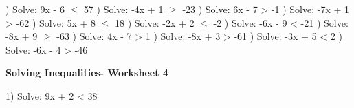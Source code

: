 \documentclass{article}%
\begin{document}
\newline%
) Solve: 9x - 6 $\leq$ 57%
\newline%
\newline%
) Solve: -4x + 1 $\geq$ -23%
\newline%
\newline%
) Solve: 6x - 7 > -1%
\newline%
\newline%
) Solve: -7x + 1 > -62%
\newline%
\newline%
) Solve: 5x + 8 $\leq$ 18%
\newline%
\newline%
) Solve: -2x + 2 $\leq$ -2%
\newline%
\newline%
) Solve: -6x - 9 < -21%
\newline%
\newline%
) Solve: -8x + 9 $\geq$ -63%
\newline%
\newline%
) Solve: 4x - 7 > 1%
\newline%
\newline%
) Solve: -8x + 3 > -61%
\newline%
\newline%
) Solve: -3x + 5 < 2%
\newline%
\newline%
) Solve: -6x - 4 > -46%
\newline%
\newline%
\newline%
\pagebreak%
\large%
\begin{center}%
\textbf{Solving Inequalities- Worksheet 4}%
\newline%
\newline%
\newline%
\end{center} \normalsize%
1) Solve: 9x + 2 < 38%
\newline%
\end{document}
